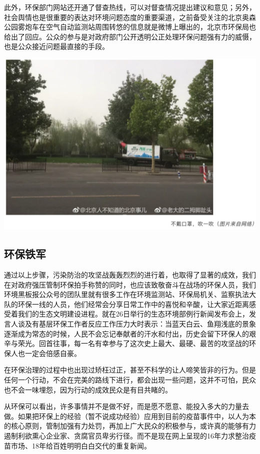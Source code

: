 \documentclass[]{book}
\begin{document}
此外，环保部门网站还开通了督查热线，可以对督查情况提出建议和意见；另外，社会舆情也是很重要的表达对环境问题态度的重要渠道，之前备受关注的北京奥森公园雾炮车在空气自动监测站周围转悠的信息就是微博上曝出的，北京市环保局也给出了回应。公众的参与是对政府部门公开透明公正处理环保问题强有力的威慑，也是公众接近问题最直接的手段。

\includegraphics[width=6.67in]{images/fw6}

\hypertarget{ux73afux4fddux94c1ux519b}{%
\subsection{环保铁军}\label{ux73afux4fddux94c1ux519b}}

通过以上步骤，污染防治的攻坚战轰轰烈烈的进行着，也取得了显著的成效，我们在对政府强压管制环保拍手称赞的同时，也应该致敬奋斗在战场的环保人员，我们环境黑板报公众号的团队里就有很多工作在环境监测站、环保局机关、监察执法大队的环保一线的人员，他们经常会分享日常工作中的喜悦和辛酸，让大家近距离感受着我们的生态文明建设进程。就在26日举行的生态环境部例行新闻发布会上，发言人谈及有基层环保工作者反应工作压力大时表示：当蓝天白云、鱼翔浅底的景象逐渐成为常态的时候，人民不会忘记奉献者的汗水和付出，历史会留下环保人的艰辛与荣光。回首往事，每一名有幸参与了这次史上最大、最硬、最苦的攻坚战的环保人也一定会倍感自豪。

在环保治理的过程中也出现过矫枉过正，甚至不科学的让人啼笑皆非的行为。但是任何一个行动，不会在完美的路线下进行，都会出现一些问题，这并不可怕，民众也不会一味埋怨，因为行动的成效民众是有目共睹的。

从环保可以看出，许多事情并不是做不好，而是愿不愿意、能投入多大的力量去做。如果把环保上的经验（暂不说成功经验）应用到目前的疫苗事件中，以人为本的核心原则，管制加强有力处罚，再加上广大民众的积极参与，或许真的能够有力遏制利欲熏心企业家、贪腐官员卑劣行径。而不是现在网上呈现的16年力求整治疫苗市场、18年给百姓明明白白交代的重复新闻。
\end{document}
